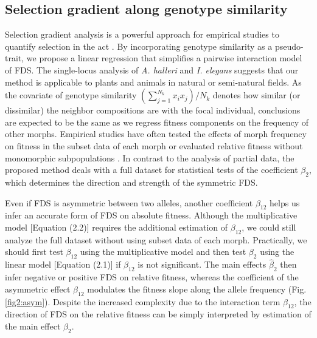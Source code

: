 \documentclass[12pt,]{article}
\begin{document}
\subsection{Selection gradient along genotype similarity}
Selection gradient analysis is a powerful approach for empirical studies to quantify selection in the act \citep{lande1983measurement, mitchell1987regression, chong2018note}. By incorporating genotype similarity as a pseudo-trait, we propose a linear regression that simplifies a pairwise interaction model of FDS. The single-locus analysis of \textit{A. halleri} and \textit{I. elegans} suggests that our method is applicable to plants and animals in natural or semi-natural fields. As the covariate of genotype similarity $(\sum^{N_k}_{j=1}x_i x_j)/N_k$ denotes how similar (or dissimilar) the neighbor compositions are with the focal individual, conclusions are expected to be the same as we regress fitness components on the frequency of other morphs. Empirical studies have often tested the effects of morph frequency on fitness in the subset data of each morph \citep{mccauley1998frequency, bennington1998field, sato2017herbivore} or evaluated relative fitness without monomorphic subpopulations \citep{gigord2001negative, takahashi2010negative}. In contrast to the analysis of partial data, the proposed method deals with a full dataset for statistical tests of the coefficient $\beta_2$, which determines the direction and strength of the symmetric FDS.

Even if FDS is asymmetric between two alleles, another coefficient $\beta_{12}$ helps us infer an accurate form of FDS on absolute fitness. Although the multiplicative model [Equation (2.2)] requires the additional estimation of $\beta_{12}$, we could still analyze the full dataset without using subset data of each morph. Practically, we should first test $\beta_{12}$ using the multiplicative model and then test $\beta_2$ using the linear model [Equation (2.1)] if $\beta_{12}$ is not significant. The main effects $\hat{\beta}_{2}$ then infer negative or positive FDS on relative fitness, whereas the coefficient of the asymmetric effect $\beta_{12}$ modulates the fitness slope along the allele frequency (Fig. \ref{fig2:asym}). Despite the increased complexity due to the interaction term $\beta_{12}$, the direction of FDS on the relative fitness can be simply interpreted by estimation of the main effect $\beta_2$.
\end{document}
